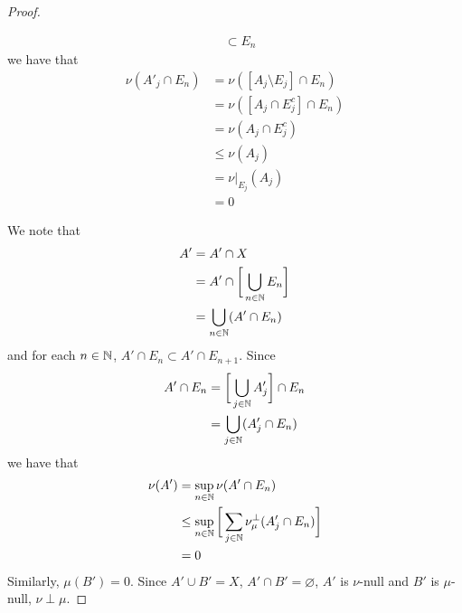 \documentclass{book}
\begin{document}
\begin{proof}
\begin{itemize}
\begin{align*}
				& \subset E_n
			\end{align*}  
			we have that 
			\begin{align*}
				\nu(A'_j \cap E_n) 
				& = \nu([A_j \setminus E_j] \cap E_n) \\
				& = \nu([A_j \cap E_j^c] \cap E_n) \\
				& = \nu(A_j \cap E_j^c) \\
				& \leq \nu(A_j) \\
				& = \nu|_{E_j}(A_j) \\
				& = 0
			\end{align*}
		\end{itemize} 
		We note that
		\begin{align*}
			A'
			& = A' \cap X \\
			& = A' \cap \bigg[ \bigcup_{n \in \mathbb{N}} E_n \bigg] \\
			& = \bigcup_{n \in \mathbb{N}} (A' \cap E_n)
		\end{align*}
		and for each $n \in \mathbb{N}$, $A' \cap E_n \subset A' \cap E_{n+1}$. Since 
		\begin{align*}
			A' \cap E_n
			& = \bigg[ \bigcup_{j \in \mathbb{N}} A'_j \bigg] \cap E_n \\
			& = \bigcup_{j \in \mathbb{N}} (A'_j \cap E_n) 
		\end{align*}
		we have that
		\begin{align*}
			\nu(A')
			& = \sup_{n \in \mathbb{N}} \nu(A' \cap E_n) \\
			& \leq \sup_{n \in \mathbb{N}} \bigg[ \sum_{j \in \mathbb{N}} \nu_{\mu}^{\perp}(A'_j \cap E_n) \bigg] \\
			& = 0
		\end{align*}
		Similarly, $\mu(B') = 0$. Since $A' \cup B' = X$, $A' \cap B' = \varnothing$, $A'$ is $\nu$-null and $B'$ is $\mu$-null, $\nu \perp \mu$.
	\end{proof}
	
	
	
	
	
	
	
	
	
	
	
	
	
	
	
	
	
	
	
	
	
	
	
	
	
	
	
	
	
	
	
	
	
\end{document}
